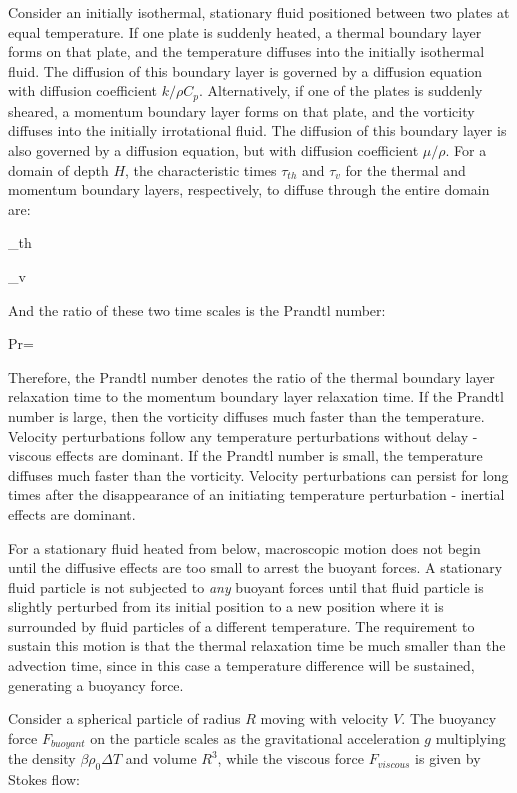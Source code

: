 \documentclass[10pt]{article}
\numberwithin{equation}{section} %
\begin{document}
Consider an initially isothermal, stationary fluid positioned between two plates at equal temperature. If one plate is suddenly heated, a thermal boundary layer forms on that plate, and the temperature diffuses into the initially isothermal fluid. The diffusion of this boundary layer is governed by a diffusion equation with diffusion coefficient \(k/\rho C_p\). Alternatively, if one of the plates is suddenly sheared, a momentum boundary layer forms on that plate, and the vorticity diffuses into the initially irrotational fluid. The diffusion of this boundary layer is also governed by a diffusion equation, but with diffusion coefficient \(\mu/\rho\). For a domain of depth \(H\), the characteristic times \(\tau_{th}\) and \(\tau_v\) for the thermal and momentum boundary layers, respectively, to diffuse through the entire domain are:

\beq
\tau_{th}\propto{}
\eeq

\beq
\tau_v\propto{}
\eeq

And the ratio of these two time scales is the Prandtl number:

\beq
Pr\equiv{}=
\eeq

Therefore, the Prandtl number denotes the ratio of the thermal boundary layer relaxation time to the momentum boundary layer relaxation time. If the Prandtl number is large, then the vorticity diffuses much faster than the temperature. Velocity perturbations follow any temperature perturbations without delay - viscous effects are dominant. If the Prandtl number is small, the temperature diffuses much faster than the vorticity. Velocity perturbations can persist for long times after the disappearance of an initiating temperature perturbation - inertial effects are dominant.

For a stationary fluid heated from below, macroscopic motion does not begin until the diffusive effects are too small to arrest the buoyant forces. A stationary fluid particle is not subjected to {\it any} buoyant forces until that fluid particle is slightly perturbed from its initial position to a new position where it is surrounded by fluid particles of a different temperature. The requirement to sustain this motion is that the thermal relaxation time be much smaller than the advection time, since in this case a temperature difference will be sustained, generating a buoyancy force.

Consider a spherical particle of radius \(R\) moving with velocity \(V\). The buoyancy force \(F_{buoyant}\) on the particle scales as the gravitational acceleration \(g\) multiplying the density \(\beta\rho_0\Delta T\) and volume \(R^3\), while the viscous force \(F_{viscous}\) is given by Stokes flow:
\end{document}
